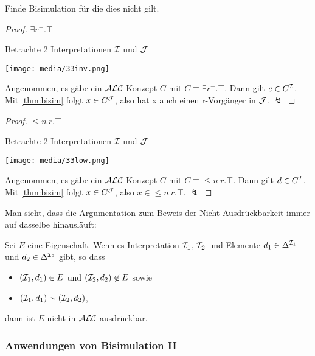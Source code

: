 \begin{tafel}[Beweisskizze] Finde Bisimulation für die dies nicht gilt.

\begin{proof} $\exists r^{-}.\top$

 Betrachte 2 Interpretationen $\mathcal{I}$ und $\mathcal{J}$

\texttt{[image: media/33inv.png]}

Angenommen, es gäbe ein $\mathcal{A}\mathcal{L}\mathcal{C}$-Konzept $C$ mit $C \equiv \exists r^{-}.\top$. Dann gilt $e \in C^{\mathcal{I}}$. Mit \autoref{thm:bisim} folgt $x \in C^{\mathcal{J}}$, also hat x auch einen r-Vorgänger in $\mathcal{J}$. $\lightning$
\end{proof} 

\begin{proof} $\leq n\ r.\top$

Betrachte 2 Interpretationen $\mathcal{I}$ und $\mathcal{J}$

\texttt{[image: media/33low.png]}

Angenommen, es gäbe ein $\mathcal{A}\mathcal{L}\mathcal{C}$-Konzept $C$ mit $C \equiv \leq n\ r.\top$. Dann gilt $d \in C^{\mathcal{I}}$. Mit \autoref{thm:bisim} folgt $x \in C^{\mathcal{J}}$, also $x \in \leq n\ r.\top$. $\lightning$
\end{proof}
\end{tafel}

Man sieht, dass die Argumentation zum Beweis der Nicht-Ausdrückbarkeit immer auf dasselbe hinausläuft:

\begin{theorem}
    \label{thm:alc-nicht-ausdruck}
Sei $E$ eine Eigenschaft. Wenn es Interpretation $\mathcal{I}_1$, $\mathcal{I}_2$
und Elemente $d_1 \in \Delta^{\mathcal{I}_1}$ und
$d_2 \in \Delta^{\mathcal{I}_2}$ gibt, so dass

\begin{itemize}
\item
  $\left( \MI_1,d_1 \right) \in E$ und
  $\left( \MI_2,d_2 \right) \not\in E$ sowie
\item
  $(\mathcal{I}_1,d_1) \sim (\mathcal{I}_2,d_2)$,
\end{itemize}

dann ist $E$ nicht in $\mathcal{A}\mathcal{L}\mathcal{C}$ ausdrückbar.
\end{theorem}

\subsubsection{Anwendungen von Bisimulation II}

